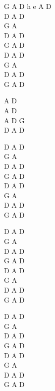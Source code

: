 \begin{chordw}
    G A D h e A D\\
    D A D\\
    G A\\
    D A D\\
    G A D\\
    D A D\\
    G A\\
    D A D\\
    G A D

    A D\\
    A D\\
    A D G\\
    D A D

    D A D\\
    G A\\
    D A D\\
    G A D\\
    D A D\\
    G A\\
    D A D\\
    G A D

    D A D\\
    G A\\
    D A D\\
    G A D\\
    D A D\\
    G A\\
    D A D\\
    G A D

    D A D\\
    G A\\
    D A D\\
    G A D\\
    D A D\\
    G A\\
    D A D\\
    G A D
\end{chordw}